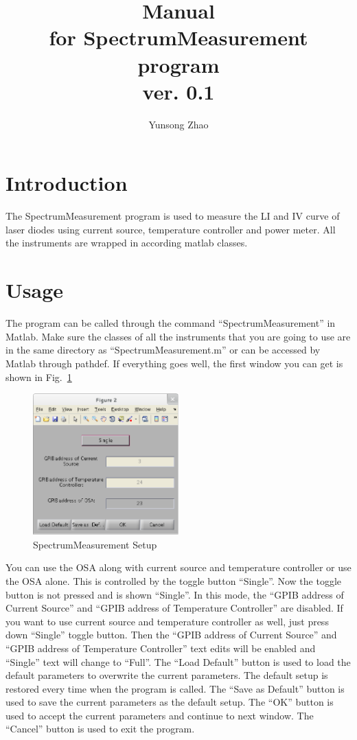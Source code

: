 \documentclass[a4paper,12pt]{article}
\title{Manual\\ \large for SpectrumMeasurement program\\ ver. 0.1}
\author{Yunsong Zhao}
\date{}
\begin{document}
\maketitle
\section{Introduction}
The SpectrumMeasurement program is used to measure the LI and IV curve of laser diodes
using current source, temperature controller and power meter. All the
instruments are wrapped in according matlab classes. 
\section{Usage}
The program can be called through the command ``SpectrumMeasurement'' in Matlab. Make
sure the classes of all the instruments that you are going to use are in the
same directory as ``SpectrumMeasurement.m'' or can be accessed by Matlab through
pathdef. If everything goes well, the first window you can get is shown in
Fig.~\ref{fig:setup}
\begin{figure}[htbp]
	\centering
	\includegraphics[width=0.5\textwidth]{./figs/setup.eps}
	\caption{SpectrumMeasurement Setup}
	\label{fig:setup}
\end{figure}

You can use the OSA along with current source and temperature controller or use
the OSA alone. This is controlled by the toggle button ``Single''. Now the
toggle button is not pressed and is shown ``Single''. In this mode, the ``GPIB
address of Current Source'' and ``GPIB address of Temperature Controller'' are
disabled. If you want to use current source and temperature controller as well,
just press down ``Single'' toggle button. Then the ``GPIB address of Current
Source'' and ``GPIB address of Temperature Controller'' text edits will be
enabled and ``Single'' text will change to ``Full''. The ``Load Default'' button
is used to load the default parameters to overwrite the current parameters. The
default setup is restored every time when the program is called. The ``Save as
Default'' button is used to save the current parameters as the default setup.
The ``OK'' button is used to accept the current parameters and continue to next
window. The ``Cancel'' button is used to exit the program.
\end{document}
